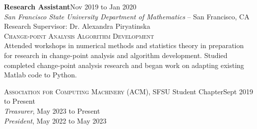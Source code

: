 \documentclass[hidelinks, 10pt]{article}
\begin{document}
{{\vspace{4mm}


\begin{minipage}[ct]{0.9\linewidth}
\textbf{Research Assistant}\hfill Nov 2019 to Jan 2020\\
\emph{San Francisco State University Department of Mathematics} -- San Francisco, CA\\
Research Supervisor: Dr. Alexandra Piryatinska\\
{\textsc{Change-point Analysis Algorithm Development}}
\vspace{1mm}\\
Attended workshops in numerical methods and statistics theory in preparation for
research in change-point analysis and algorithm development.  Studied completed
change-point analysis research and began work on adapting existing Matlab code
to Python.
\end{minipage}

}

\vspace{4mm}


\hrulefill

\vspace{4mm}

\begin{minipage}[ct]{0.9\linewidth}
\textsc{Association for Computing Machinery} (ACM), SFSU Student Chapter\hfill Sept 2019 to
Present\\
\emph{Treasurer}, May 2023 to Present\\
\emph{President}, May 2022 to May 2023


\end{minipage}}
\end{document}

